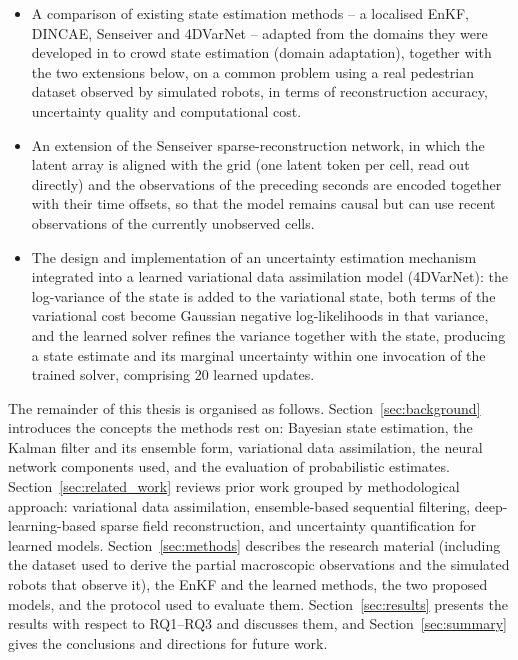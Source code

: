 \documentclass[english, 12pt, a4paper, elec, utf8, a-2b, online]{aaltothesis}
\begin{document}
\begin{itemize}
    \item A comparison of existing state estimation methods -- a localised
    EnKF, DINCAE, Senseiver and 4DVarNet -- adapted from the domains they were
    developed in to crowd state estimation (domain adaptation), together with
    the two extensions below, on a common problem using a real pedestrian
    dataset observed by simulated robots, in terms of reconstruction accuracy,
    uncertainty quality and computational cost.
    \item An extension of the Senseiver sparse-reconstruction network,
    in which the latent array is aligned with the grid (one latent
    token per cell, read out directly) and the observations of the
    preceding seconds are encoded together with their time offsets,
    so that the model remains causal but can use recent observations
    of the currently unobserved cells.
    \item The design and implementation of an uncertainty estimation
    mechanism integrated into a learned variational data assimilation
    model (4DVarNet): the log-variance of the state is added to the
    variational state, both terms of the variational cost become Gaussian
    negative log-likelihoods in that variance, and the learned solver
    refines the variance together with the state, producing a state
    estimate and its marginal uncertainty within one invocation of the
    trained solver, comprising 20 learned updates.
\end{itemize}


The remainder of this thesis is organised as follows.
Section~\ref{sec:background} introduces the concepts the methods rest
on: Bayesian state estimation, the Kalman filter and its ensemble
form, variational data assimilation, the neural network components
used, and the evaluation of probabilistic estimates.
Section~\ref{sec:related_work} reviews prior work grouped by
methodological approach: variational data assimilation, ensemble-based
sequential filtering, deep-learning-based sparse field reconstruction,
and uncertainty quantification for learned models.
Section~\ref{sec:methods} describes the research material (including
the dataset used to derive the partial macroscopic observations
and the simulated robots that observe it), the EnKF and the learned
methods, the two proposed models, and the protocol used to
evaluate them.
Section~\ref{sec:results} presents the results with respect to
RQ1--RQ3 and discusses them, and Section~\ref{sec:summary} gives the
conclusions and directions for future work.
\end{document}
